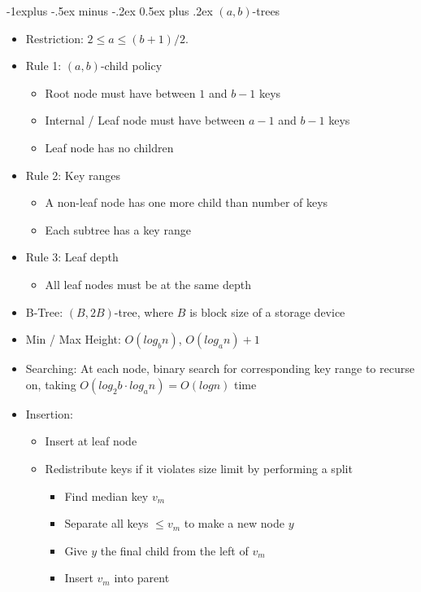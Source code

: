 \documentclass[10pt, landscape]{article}
\makeatletter
\renewcommand{\section}{\@startsection{section}{1}{0mm}%
                                {-1ex plus -.5ex minus -.2ex}%
                                {0.5ex plus .2ex}%
                                {\normalfont\large\bfseries}}
\renewcommand{\section}{\@startsection{section}{2}{0mm}%
                                {-1explus -.5ex minus -.2ex}%
                                {0.5ex plus .2ex}%
                                {\normalfont\normalsize\bfseries}}
\makeatother
\begin{document}
\begin{multicols*}{4}
\section{$(a,b)$-trees}
\begin{itemize}
    \item Restriction: $2 \leq a \leq (b+1)/2$.
    \item Rule 1: $(a,b)$-child policy
    \begin{itemize}
        \item Root node must have between $1$ and $b-1$ keys
        \item Internal / Leaf node must have between $a-1$ and $b-1$ keys
        \item Leaf node has no children
    \end{itemize}
    \item Rule 2: Key ranges
    \begin{itemize}
        \item A non-leaf node has one more child than number of keys
        \item Each subtree has a key range
    \end{itemize}
    \item Rule 3: Leaf depth
    \begin{itemize}
        \item All leaf nodes must be at the same depth
    \end{itemize}
    \item B-Tree: $(B, 2B)$-tree, where $B$ is block size of a storage device
    \item Min / Max Height: $O(log_bn)$, $O(log_an)+1$
    \item Searching: At each node, binary search for corresponding key range to recurse on, taking $O(log_2b \cdot log_an)=O(logn)$ time
    \item Insertion:
    \begin{itemize}
        \item Insert at leaf node
        \item Redistribute keys if it violates size limit by performing a split
        \begin{itemize}
            \item Find median key $v_m$
            \item Separate all keys $\leq v_m$ to make a new node $y$
            \item Give $y$ the final child from the left of $v_m$
            \item Insert $v_m$ into parent

\end{itemize}
\end{itemize}
\end{itemize}
\end{multicols*}
\end{document}
